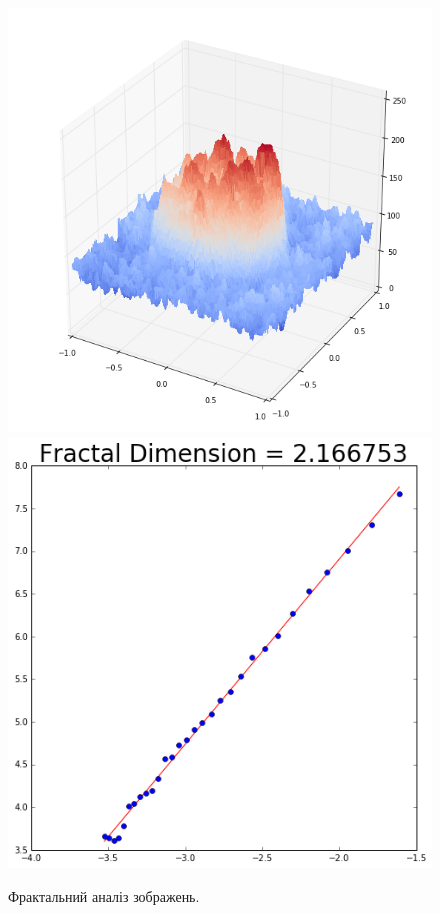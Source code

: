 \begin{figure}[b!]
	\endminipage\hfill
	\centering		
	\includegraphics[width=1\linewidth]{Figures/Chapter3/fdim_1_2.png}
	\endminipage\hfill
	\centering	
	\includegraphics[width=1\linewidth]{Figures/Chapter3/fdim_1_3.png}
	\endminipage\hfill
	\endminipage\hfill
	
	\caption{Фрактальний аналіз зображень.}
	\label{fig:fdim}
\end{figure}

